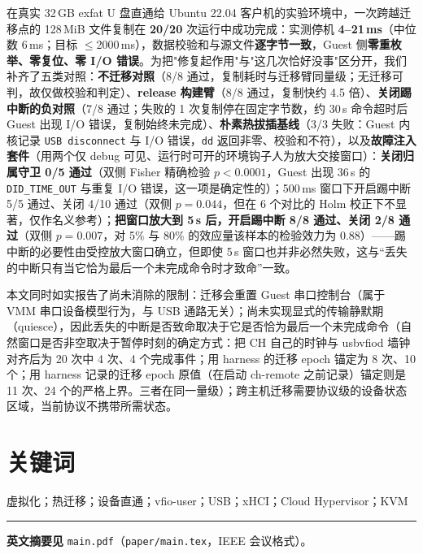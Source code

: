 \documentclass[11pt,a4paper]{ctexart}
\begin{document}
在真实 32\,GB exfat U 盘直通给 Ubuntu 22.04 客户机的实验环境中，一次跨越迁移点的 128\,MiB 文件复制在 \textbf{20/20} 次运行中成功完成：实测停机 \textbf{4--21\,ms}（中位数 6\,ms；目标 $\le$2000\,ms），数据校验和与源文件\textbf{逐字节一致}，Guest 侧\textbf{零重枚举、零复位、零 I/O 错误}。为把"修复起作用"与"这几次恰好没事"区分开，我们补齐了五类对照：\textbf{不迁移对照}（8/8 通过，复制耗时与迁移臂同量级；无迁移可判，故仅做校验和判定）、\textbf{release 构建臂}（8/8 通过，复制快约 4.5 倍）、\textbf{关闭踢中断的负对照}（7/8 通过；失败的 1 次复制停在固定字节数，约 30\,s 命令超时后 Guest 出现 I/O 错误，复制始终未完成）、\textbf{朴素热拔插基线}（3/3 失败：Guest 内核记录 \texttt{USB disconnect} 与 I/O 错误，\texttt{dd} 返回非零、校验和不符），以及\textbf{故障注入套件}（用两个仅 debug 可见、运行时可开的环境钩子人为放大交接窗口）：\textbf{关闭归属守卫 0/5 通过}（双侧 Fisher 精确检验 $p<0.0001$，Guest 出现 36\,s 的 \texttt{DID\_TIME\_OUT} 与重复 I/O 错误，这一项是确定性的）；500\,ms 窗口下开启踢中断 5/5 通过、关闭 4/10 通过（双侧 $p=0.044$，但在 6 个对比的 Holm 校正下不显著，仅作名义参考）；\textbf{把窗口放大到 5\,s 后，开启踢中断 8/8 通过、关闭 2/8 通过}（双侧 $p=0.007$，对 5\% 与 80\% 的效应量该样本的检验效力为 0.88）——踢中断的必要性由受控放大窗口确立，但即使 5\,s 窗口也并非必然失败，这与“丢失的中断只有当它恰为最后一个未完成命令时才致命”一致。

本文同时如实报告了尚未消除的限制：迁移会重置 Guest 串口控制台（属于 VMM 串口设备模型行为，与 USB 通路无关）；尚未实现显式的传输静默期（quiesce），因此丢失的中断是否致命取决于它是否恰为最后一个未完成命令（自然窗口是否非空取决于暂停时刻的确定方式：把 CH 自己的时钟与 usbvfiod 墙钟对齐后为 20 次中 4 次、4 个完成事件；用 harness 的迁移 epoch 锚定为 8 次、10 个；用 harness 记录的迁移 epoch 原值（在启动 ch-remote 之前记录）锚定则是 11 次、24 个的严格上界。三者在同一量级）；跨主机迁移需要协议级的设备状态区域，当前协议不携带所需状态。

\section*{关键词}
虚拟化；热迁移；设备直通；vfio-user；USB；xHCI；Cloud Hypervisor；KVM

\vspace{1em}
\noindent\rule{\textwidth}{0.4pt}
\vspace{0.5em}

\noindent\textbf{英文摘要见} \texttt{main.pdf}（\texttt{paper/main.tex}，IEEE 会议格式）。
\end{document}
